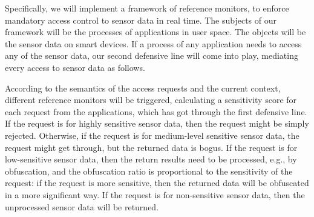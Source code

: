Specifically, we will implement a framework of reference monitors, to enforce
mandatory access control to sensor data in real time. The subjects of our
framework will be the processes of applications in user space. The objects will
be the sensor data on smart devices. If a process of any application needs to
access any of the sensor data, our second defensive line will come into play,
mediating every access to sensor data as follows. 

According to the semantics of the access requests and the current context,
different reference monitors will be triggered, calculating a sensitivity score
for each request from the applications, which has got through the first
defensive line. If the request is for highly sensitive sensor data, then the
request might be simply rejected. Otherwise, if the request is for medium-level
sensitive sensor data, the request might get through, but the returned data is
bogus. If the request is for low-sensitive sensor data, then the return results
need to be processed, e.g., by obfuscation, and the obfuscation ratio is
proportional to the sensitivity of the request: if the request is more
sensitive, then the returned data will be obfuscated in a more signiﬁcant way.
If the request is for non-sensitive sensor data, then the unprocessed sensor
data will be returned.
